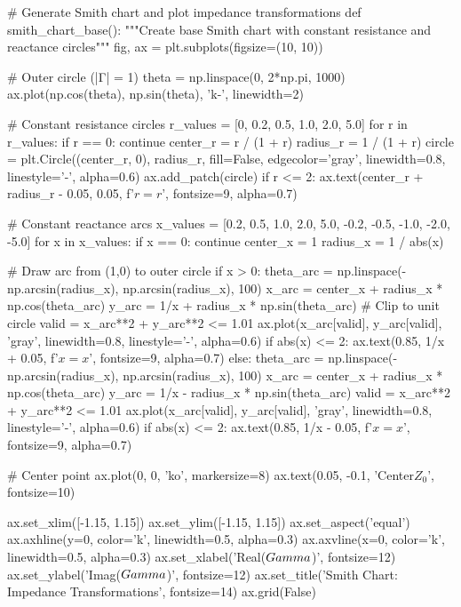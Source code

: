\documentclass[11pt,a4paper]{article}
\begin{document}
\begin{pycode}
# Generate Smith chart and plot impedance transformations
def smith_chart_base():
    """Create base Smith chart with constant resistance and reactance circles"""
    fig, ax = plt.subplots(figsize=(10, 10))

    # Outer circle (|Γ| = 1)
    theta = np.linspace(0, 2*np.pi, 1000)
    ax.plot(np.cos(theta), np.sin(theta), 'k-', linewidth=2)

    # Constant resistance circles
    r_values = [0, 0.2, 0.5, 1.0, 2.0, 5.0]
    for r in r_values:
        if r == 0:
            continue
        center_r = r / (1 + r)
        radius_r = 1 / (1 + r)
        circle = plt.Circle((center_r, 0), radius_r, fill=False,
                           edgecolor='gray', linewidth=0.8, linestyle='-', alpha=0.6)
        ax.add_patch(circle)
        if r <= 2:
            ax.text(center_r + radius_r - 0.05, 0.05, f'$r={r}$', fontsize=9, alpha=0.7)

    # Constant reactance arcs
    x_values = [0.2, 0.5, 1.0, 2.0, 5.0, -0.2, -0.5, -1.0, -2.0, -5.0]
    for x in x_values:
        if x == 0:
            continue
        center_x = 1
        radius_x = 1 / abs(x)

        # Draw arc from (1,0) to outer circle
        if x > 0:
            theta_arc = np.linspace(-np.arcsin(radius_x), np.arcsin(radius_x), 100)
            x_arc = center_x + radius_x * np.cos(theta_arc)
            y_arc = 1/x + radius_x * np.sin(theta_arc)
            # Clip to unit circle
            valid = x_arc**2 + y_arc**2 <= 1.01
            ax.plot(x_arc[valid], y_arc[valid], 'gray', linewidth=0.8, linestyle='-', alpha=0.6)
            if abs(x) <= 2:
                ax.text(0.85, 1/x + 0.05, f'$x={x}$', fontsize=9, alpha=0.7)
        else:
            theta_arc = np.linspace(-np.arcsin(radius_x), np.arcsin(radius_x), 100)
            x_arc = center_x + radius_x * np.cos(theta_arc)
            y_arc = 1/x - radius_x * np.sin(theta_arc)
            valid = x_arc**2 + y_arc**2 <= 1.01
            ax.plot(x_arc[valid], y_arc[valid], 'gray', linewidth=0.8, linestyle='-', alpha=0.6)
            if abs(x) <= 2:
                ax.text(0.85, 1/x - 0.05, f'$x={x}$', fontsize=9, alpha=0.7)

    # Center point
    ax.plot(0, 0, 'ko', markersize=8)
    ax.text(0.05, -0.1, 'Center\n$Z_0$', fontsize=10)

    ax.set_xlim([-1.15, 1.15])
    ax.set_ylim([-1.15, 1.15])
    ax.set_aspect('equal')
    ax.axhline(y=0, color='k', linewidth=0.5, alpha=0.3)
    ax.axvline(x=0, color='k', linewidth=0.5, alpha=0.3)
    ax.set_xlabel('Real($\\Gamma$)', fontsize=12)
    ax.set_ylabel('Imag($\\Gamma$)', fontsize=12)
    ax.set_title('Smith Chart: Impedance Transformations', fontsize=14)
    ax.grid(False)


\end{pycode}
\end{document}

